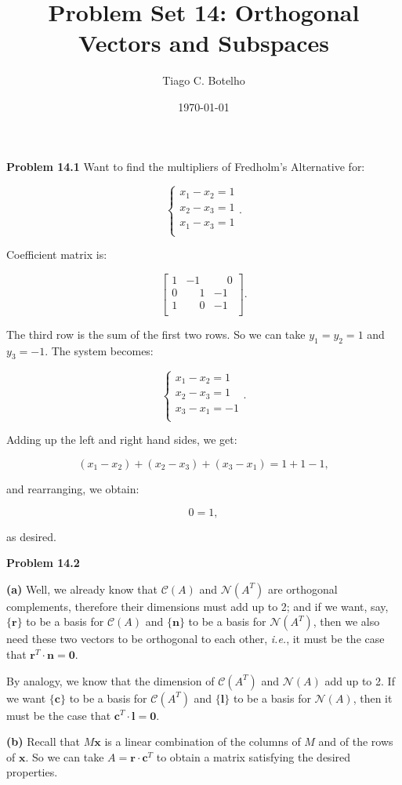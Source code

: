 \documentclass{article}
\title{Problem Set 14: Orthogonal Vectors and Subspaces}
\author{Tiago C. Botelho}
\date{\today}
\begin{document}
\maketitle

\noindent \textbf{Problem 14.1} Want to find the multipliers of Fredholm's Alternative for:

\[
\begin{cases}
x_1 - x_2 = 1\\
x_2 - x_3 = 1\\
x_1 - x_3 = 1\\
\end{cases}.
\]

Coefficient matrix is:

\[
\begin{bmatrix}
1 & -1 & \phantom{-}0\\
0 & \phantom{-}1 & -1\\
1 & \phantom{-}0 & -1\\
\end{bmatrix}.
\]

The third row is the sum of the first two rows. So we can take $y_1 = y_2 = 1$ and $y_3 = -1$. The system becomes:

\[
\begin{cases}
x_1 - x_2 = 1\\
x_2 - x_3 = 1\\
x_3 - x_1 = -1\\
\end{cases}.
\]

Adding up the left and right hand sides, we get:

\[
(x_1 - x_2) + (x_2 - x_3) + (x_3 - x_1) = 1 + 1 -1,
\]

and rearranging, we obtain:

\[
0 = 1,
\]

as desired.

\noindent \textbf{Problem 14.2}

\noindent \textbf{(a)} Well, we already know that $\mathcal{C}(A)$ and $\mathcal{N}(A^{T})$ are orthogonal complements, therefore their dimensions must add up to 2; and if we want, say, $\{\mathbf{r}\}$ to be a basis for $\mathcal{C}(A)$ and $\{\mathbf{n}\}$ to be a basis for $\mathcal{N}(A^{T})$, then we also need these two vectors to be orthogonal to each other, \textit{i.e.}, it must be the case that $\mathbf{r}^{T} \cdot \mathbf{n} = \mathbf{0}$.

By analogy, we know that the dimension of $\mathcal{C}(A^{T})$ and $\mathcal{N}(A)$ add up to 2. If we want $\{\mathbf{c}\}$ to be a basis for $\mathcal{C}(A^{T})$ and $\{\mathbf{l}\}$ to be a basis for $\mathcal{N}(A)$, then it must be the case that $\mathbf{c}^{T} \cdot \mathbf{l} = \mathbf{0}$.

\noindent \textbf{(b)} Recall that $M\mathbf{x}$ is a linear combination of the columns of $M$ and of the rows of $\mathbf{x}$. So we can take $A = \mathbf{r} \cdot \mathbf{c}^{T}$ to obtain a matrix satisfying the desired properties.
\end{document}
